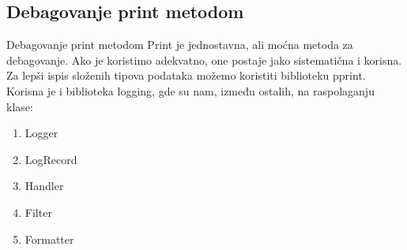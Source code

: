 \documentclass{beamer}
\begin{document}
\subsection{Debagovanje print metodom}
\begin{frame}{Debagovanje print metodom}
Print je jednostavna, ali moćna metoda za debagovanje. Ako je koristimo adekvatno, one postaje jako sistematična i korisna. Za lepši ispis složenih tipova podataka možemo koristiti biblioteku pprint. \\
Korisna je i biblioteka logging, gde su nam, između ostalih, na raspolaganju klase:
\begin{enumerate}
    \item Logger
    \item LogRecord
    \item Handler
    \item Filter
    \item Formatter
\end{enumerate}  
\end{frame}

\end{document}
